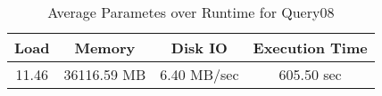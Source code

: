 \documentclass[../../main.tex]{subfiles}
\begin{document}
    \begin{table}
        \begin{center}
            \begin{tabular}{ |c|c|c|c| } 
            \hline
            Load & Memory & Disk IO & Execution Time\\
            \hline
            11.46 & 36116.59 MB & 6.40 MB/sec & 605.50 sec \\
            \hline
            \end{tabular}
            \\[1pt]
            \caption{Average Parametes over Runtime for Query08}
        \end{center}
    \end{table}
    \pagebreak
\end{document}
